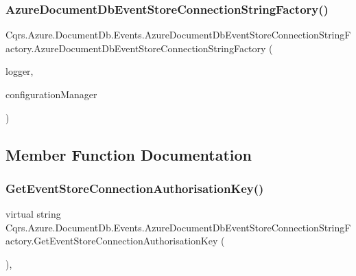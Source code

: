 \subsubsection{\texorpdfstring{Azure\+Document\+Db\+Event\+Store\+Connection\+String\+Factory()}{AzureDocumentDbEventStoreConnectionStringFactory()}}
{\footnotesize\ttfamily Cqrs.\+Azure.\+Document\+Db.\+Events.\+Azure\+Document\+Db\+Event\+Store\+Connection\+String\+Factory.\+Azure\+Document\+Db\+Event\+Store\+Connection\+String\+Factory (\begin{DoxyParamCaption}\item[{I\+Logger}]{logger,  }\item[{\hyperlink{interfaceCqrs_1_1Configuration_1_1IConfigurationManager}{I\+Configuration\+Manager}}]{configuration\+Manager }\end{DoxyParamCaption})}



\subsection{Member Function Documentation}
\mbox{\label{classCqrs_1_1Azure_1_1DocumentDb_1_1Events_1_1AzureDocumentDbEventStoreConnectionStringFactory_aa16b2178e1ca8893c120097f6dd47022_aa16b2178e1ca8893c120097f6dd47022}} 
\subsubsection{\texorpdfstring{Get\+Event\+Store\+Connection\+Authorisation\+Key()}{GetEventStoreConnectionAuthorisationKey()}}
{\footnotesize\ttfamily virtual string Cqrs.\+Azure.\+Document\+Db.\+Events.\+Azure\+Document\+Db\+Event\+Store\+Connection\+String\+Factory.\+Get\+Event\+Store\+Connection\+Authorisation\+Key (\begin{DoxyParamCaption}{ }\end{DoxyParamCaption})\hspace{0.3cm}{\ttfamily [protected]}, {\ttfamily [virtual]}}

